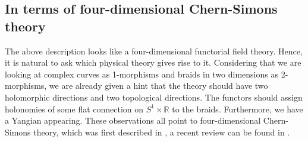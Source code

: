 \documentclass[11pt]{report}
\theoremstyle{definition}
\theoremstyle{remark}
\theoremstyle{remark}
\newcommand{\R}{\mathbb{R}}
\begin{document}

\pagebreak

\subsection{In terms of four-dimensional Chern-Simons theory}

The above description looks like a four-dimensional functorial field theory. Hence, it is natural to ask which physical theory gives rise to it. Considering that we are looking at complex curves as 1-morphisms and braids in two dimensions as 2-morphisms, we are already given a hint that the theory should have two holomorphic directions and two topological directions. The functors should assign holonomies of some flat connection on $S^1 \times \R$ to the braids. Furthermore, we have a Yangian appearing. These observations all point to four-dimensional Chern-Simons theory, which was first described in \cite{article:costello:2013}, a recent review can be found in \cite{article:lacroix:2022}.
\end{document}
